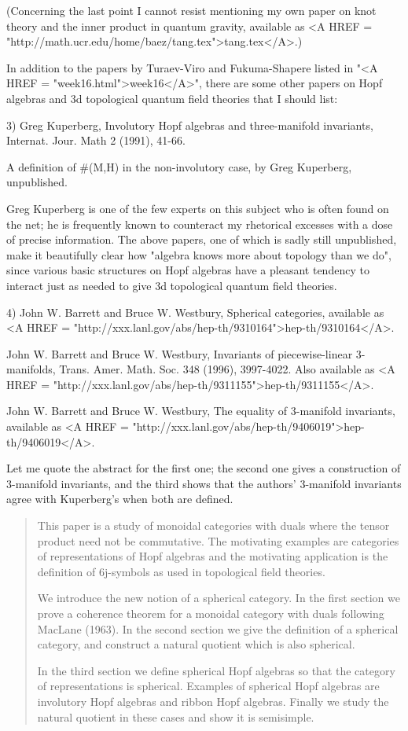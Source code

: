 (Concerning the last point I cannot resist mentioning my own paper on 
knot theory and the inner product in quantum gravity, available as
<A HREF = "http://math.ucr.edu/home/baez/tang.tex">tang.tex</A>.)


In addition to the papers by Turaev-Viro and Fukuma-Shapere listed in
"<A HREF = "week16.html">week16</A>", there are some other papers on Hopf algebras and 3d
topological quantum field theories that I should list:

3) Greg Kuperberg, Involutory Hopf algebras and three-manifold invariants, 
Internat. Jour. Math 2 (1991), 41-66.

A definition of #(M,H) in the non-involutory case, by Greg Kuperberg,
unpublished.  

Greg Kuperberg is one of the few experts on this subject who is often
found on the net; he is frequently known to counteract my rhetorical
excesses with a dose of precise information.  The above papers, one of
which is sadly still unpublished, make it beautifully clear how "algebra
knows more about topology than we do", since various basic structures
on Hopf algebras have a pleasant tendency to interact just as needed
to give 3d topological quantum field theories.  

4) John W. Barrett and Bruce W. Westbury,
Spherical categories, 
available as 
<A HREF = "http://xxx.lanl.gov/abs/hep-th/9310164">hep-th/9310164</A>.

John W. Barrett and Bruce W. Westbury, 
Invariants of piecewise-linear 3-manifolds, 
Trans. Amer. Math. Soc. 348 (1996), 3997-4022.  Also 
available
as <A HREF = "http://xxx.lanl.gov/abs/hep-th/9311155">hep-th/9311155</A>.

John W. Barrett and Bruce W. Westbury, 
The equality of 3-manifold invariants, 
available as
<A HREF = "http://xxx.lanl.gov/abs/hep-th/9406019">hep-th/9406019</A>.

Let me quote the abstract for the first one; the second one gives 
a construction of 3-manifold invariants, and the third shows that 
the authors' 3-manifold invariants agree with Kuperberg's when both
are defined.

\begin{quote}

This paper is a study of monoidal categories with duals where the
tensor product need not be commutative. The motivating examples are
categories of representations of Hopf algebras and the motivating
application is the definition of 6j-symbols as used in topological field
theories.

We introduce the new notion of a spherical category.  In the first
section we prove a coherence theorem for a monoidal category with duals
following MacLane (1963).  In the second section we give the definition
of a spherical category, and construct a natural quotient which is also
spherical.

In the third section we define spherical Hopf algebras so that the
category of representations is spherical. Examples of spherical Hopf
algebras are involutory Hopf algebras and ribbon Hopf algebras. Finally
we study the natural quotient in these cases and show it is semisimple.

\end{quote}
    

